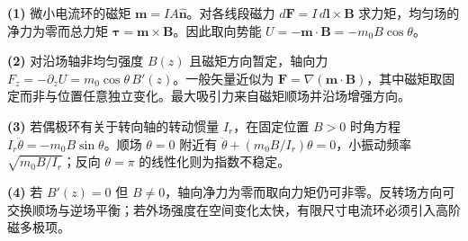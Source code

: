 \par\noindent\textbf{(1)} 微小电流环的磁矩 \(\boldsymbol m=IA\hat{\boldsymbol n}\)。对各线段磁力 \(d\boldsymbol F=I\,d\boldsymbol l\times\boldsymbol B\) 求力矩，均匀场的净力为零而总力矩 \(\boldsymbol\tau=\boldsymbol m\times\boldsymbol B\)。因此取向势能 \(U=-\boldsymbol m\cdot\boldsymbol B=-m_0B\cos\theta\)。
\par\noindent\textbf{(2)} 对沿场轴非均匀强度 \(B(z)\) 且磁矩方向暂定，轴向力 \(F_z=-\partial_z U=m_0\cos\theta\,B'(z)\)。一般矢量近似为 \(\boldsymbol F=\nabla(\boldsymbol m\cdot\boldsymbol B)\)，其中磁矩取固定而非与位置任意独立变化。最大吸引力来自磁矩顺场并沿场增强方向。
\par\noindent\textbf{(3)} 若偶极环有关于转向轴的转动惯量 \(I_r\)，在固定位置 \(B>0\) 时角方程 \(I_r\ddot\theta=-m_0B\sin\theta\)。顺场 \(\theta=0\) 附近有 \(\ddot\theta+(m_0B/I_r)\theta=0\)，小振动频率 \(\sqrt{m_0B/I_r}\)；反向 \(\theta=\pi\) 的线性化则为指数不稳定。
\par\noindent\textbf{(4)} 若 \(B'(z)=0\) 但 \(B\ne0\)，轴向净力为零而取向力矩仍可非零。反转场方向可交换顺场与逆场平衡；若外场强度在空间变化太快，有限尺寸电流环必须引入高阶磁多极项。
